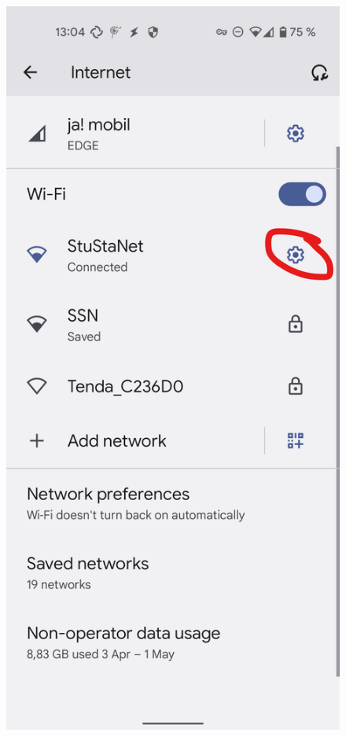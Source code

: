 \documentclass[a4paper,12pt]{scrartcl}
\begin{document}
\begin{figure}[h]
	\centering
	\begin{minipage}{0.24\textwidth}
		\includegraphics[width=0.7\linewidth,keepaspectratio]{Bilder/Android/android12_1}
	\end{minipage}
	\begin{minipage}{0.24\textwidth}

\end{minipage}
\end{figure}
\end{document}
